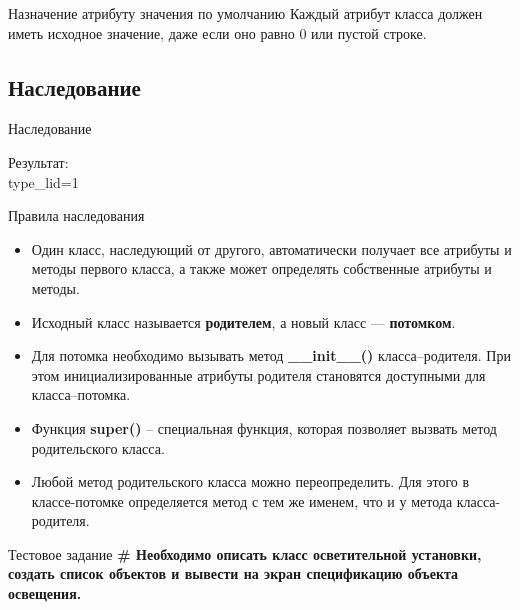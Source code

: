 \documentclass[12pt]{beamer}
\begin{document}
\begin{frame}{Назначение атрибуту значения по умолчанию}
Каждый атрибут класса должен иметь исходное значение, даже если оно равно 0 или пустой строке.
\vspace{0.5cm}

\vspace{0.5cm}
\end{frame}


\subsection{Наследование}
\begin{frame}{Наследование}

Результат: \\
type\_lid=1\\
\end{frame}


\begin{frame}{Правила наследования}
\begin{itemize}
\item Один класс, наследующий от другого, автоматически получает все атрибуты и методы первого класса, а также может определять собственные атрибуты и методы.
\item Исходный класс называется \textbf{родителем}, а новый класс — \textbf{потомком}.
\item Для потомка необходимо вызывать метод \textbf{\_\_init\_\_()} класса--родителя. При этом инициализированные атрибуты родителя становятся доступными для класса--потомка.
\item Функция \textbf{super()} -- специальная функция, которая позволяет вызвать метод родительского класса.
\item Любой метод родительского класса можно переопределить. Для этого в классе-потомке определяется метод с тем же именем, что и у метода класса-родителя.
\end{itemize}
\end{frame}


\begin{frame}{Тестовое задание}
\textbf{\# Необходимо описать класс осветительной установки, создать список объектов и вывести на экран спецификацию объекта освещения.} \\

\end{frame}
\end{document}
